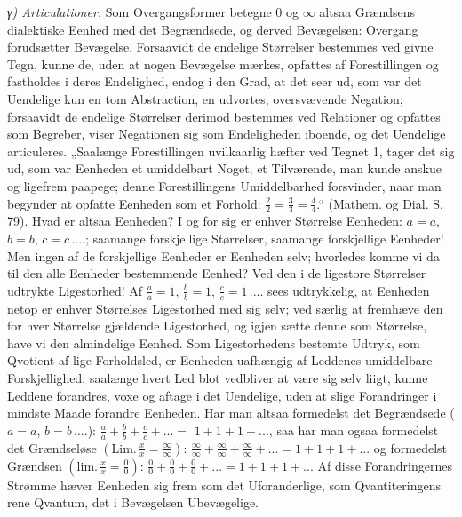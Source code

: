 \documentclass[12pt,a4paper]{book}
\begin{document}
\emph{γ) Articulationer.} Som Overgangsformer betegne $0$ og $\infty$
altsaa Grændsens dialektiske Eenhed med det
Begrændsede, og derved Bevægelsen: Overgang forudsætter Bevægelse.
Forsaavidt de endelige Størrelser bestemmes ved givne Tegn, kunne de,
uden at nogen Bevægelse mærkes, opfattes af Forestillingen og
fastholdes i deres Endelighed, endog i den Grad, at det seer ud, som
var det Uendelige kun en tom Abstraction, en udvortes, oversvævende
Negation; forsaavidt de endelige Størrelser derimod bestemmes ved
Relationer og opfattes som Begreber, viser Negationen sig som
Endeligheden iboende, og det Uendelige articuleres. „Saalænge
Forestillingen uvilkaarlig hæfter ved Tegnet 1, tager det sig ud, som
var Eenheden et umiddelbart Noget, et Tilværende, man kunde anskue og
ligefrem paapege; denne Forestillingens Umiddelbarhed forsvinder, naar
man begynder at opfatte Eenheden som et Forhold: $\frac{2}{2} =
\frac{3}{3} = \frac{4}{4}$.“ (Mathem. og Dial. S. 79). Hvad er altsaa
Eenheden? I og for sig er enhver Størrelse Eenheden: $a = a$, $b = b$,
$c = c\,....$; saamange forskjellige Størrelser, saamange forskjellige
Eenheder! Men ingen af de forskjellige Eenheder er Eenheden selv;
hvorledes komme vi da til den alle Eenheder bestemmende Eenhed? Ved den
i de ligestore Størrelser udtrykte Ligestorhed! Af $\frac{a}{a} = 1$,
$\frac{b}{b} = 1$, $\frac{c}{c} = 1\,....$ sees udtrykkelig, at
Eenheden netop er enhver Størrelses Ligestorhed med sig selv; ved
særlig at fremhæve den for hver Størrelse gjældende Ligestorhed, og
igjen sætte denne som Størrelse, have vi den almindelige Eenhed. Som
Ligestorhedens bestemte Udtryk, som Qvotient af lige Forholdsled, er
Eenheden uafhængig af Leddenes umiddelbare Forskjellighed; saalænge
hvert Led blot vedbliver at være sig selv liigt, kunne Leddene
forandres, voxe og aftage i det Uendelige, uden at slige Forandringer i
mindste Maade forandre Eenheden. Har man altsaa formedelst det
Begrændsede ($a = a$, $b = b\,....$): $\frac{a}{a} + \frac{b}{b} +
\frac{c}{c} + ... =$
$1 + 1 + 1 + ...$, saa har man ogsaa formedelst det Grændseløse
$\left(\mathrm{Lim.}\,\frac{x}{x} = \frac{\infty}{\infty}\right)$:
$\frac{\infty}{\infty} + \frac{\infty}{\infty} + \frac{\infty}{\infty}
+ ... = 1 + 1 + 1 + ...$ og formedelst Grændsen
$\left(\mathrm{lim.}\,\frac{x}{x} = \frac{0}{0}\right)$: $\frac{0}{0} +
\frac{0}{0} + \frac{0}{0} + ... = 1 + 1 + 1 + ...$ Af disse
Forandringernes Strømme hæver Eenheden sig frem som det Uforanderlige,
som Qvantiteringens rene Qvantum, det i Bevægelsen Ubevægelige.
\end{document}
